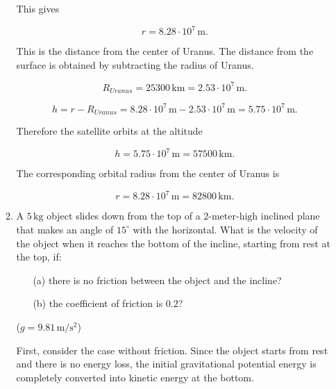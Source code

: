 \documentclass[letterpaper,12pt]{letter}
\begin{document}
\begin{enumerate}[label=\Roman*.]
\begin{enumerate}[label=\arabic*.]
This gives

$$r=8.28\cdot10^7\,\mathrm{m}.$$

This is the distance from the center of Uranus. The distance from the surface is obtained by subtracting the radius of Uranus.

$$R_{Uranus}=25300\,\mathrm{km}=2.53\cdot10^7\,\mathrm{m}.$$

$$h=r-R_{Uranus}=8.28\cdot10^7\,\mathrm{m}-2.53\cdot10^7\,\mathrm{m}=5.75\cdot10^7\,\mathrm{m}.$$

Therefore the satellite orbits at the altitude

$$\boxed{h=5.75\cdot10^7\,\mathrm{m}=57500\,\mathrm{km}}.$$

The corresponding orbital radius from the center of Uranus is

$$\boxed{r=8.28\cdot10^7\,\mathrm{m}=82800\,\mathrm{km}}.$$


\item A $5\,\text{kg}$ object slides down from the top of a $2\text{-meter-high}$ inclined plane that makes an angle of $15^\circ$ with the horizontal. What is the velocity of the object when it reaches the bottom of the incline, starting from rest at the top, if:
\begin{enumerate}
    \item[(a)] there is no friction between the object and the incline?
    \item[(b)] the coefficient of friction is $0.2$?
\end{enumerate}
($g=9.81\,\mathrm{m/s^{2}}$)    

\bigskip

\begin{center}
\end{center}

First, consider the case without friction. Since the object starts from rest and there is no energy loss, the initial gravitational potential energy is completely converted into kinetic energy at the bottom.


\end{enumerate}
\end{enumerate}
\end{document}
